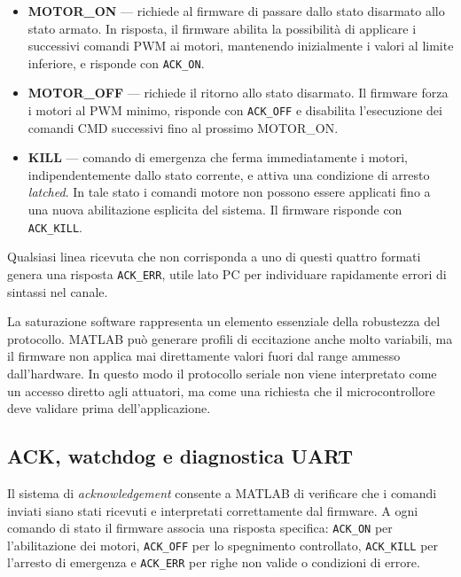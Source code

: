 \documentclass[11pt]{report}
\begin{document}
\begin{itemize}
\begin{lstlisting}[caption={Parsing del comando CMD e saturazione dei valori PWM ricevuti da MATLAB.}, label={lst:nome}]
        ext_roll_pwm  = (uint16_t) roll;
        ext_pitch_pwm = (uint16_t) pitch;
    }
}

}
\end{lstlisting}

    \item \textbf{MOTOR\_ON} — richiede al firmware di passare dallo stato disarmato allo stato armato. In risposta, il firmware abilita la possibilità di applicare i successivi comandi PWM ai motori, mantenendo inizialmente i valori al limite inferiore, e risponde con \texttt{ACK\_ON}.

    \item \textbf{MOTOR\_OFF} — richiede il ritorno allo stato disarmato. Il firmware forza i motori al PWM minimo, risponde con \texttt{ACK\_OFF} e disabilita l'esecuzione dei comandi CMD successivi fino al prossimo MOTOR\_ON.

    \item \textbf{KILL} — comando di emergenza che ferma immediatamente i motori, indipendentemente dallo stato corrente, e attiva una condizione di arresto \textit{latched}. In tale stato i comandi motore non possono essere applicati fino a una nuova abilitazione esplicita del sistema. Il firmware risponde con \texttt{ACK\_KILL}.
\end{itemize}

Qualsiasi linea ricevuta che non corrisponda a uno di questi quattro formati genera una risposta \texttt{ACK\_ERR}, utile lato PC per individuare rapidamente errori di sintassi nel canale.

La saturazione software rappresenta un elemento essenziale della robustezza del protocollo. MATLAB può generare profili di eccitazione anche molto variabili, ma il firmware non applica mai direttamente valori fuori dal range ammesso dall'hardware. In questo modo il protocollo seriale non viene interpretato come un accesso diretto agli attuatori, ma come una richiesta che il microcontrollore deve validare prima dell'applicazione.

\subsection{ACK, watchdog e diagnostica UART}
Il sistema di \textit{acknowledgement} consente a MATLAB di verificare che i comandi inviati siano stati ricevuti e interpretati correttamente dal firmware. A ogni comando di stato il firmware associa una risposta specifica: \texttt{ACK\_ON} per l'abilitazione dei motori, \texttt{ACK\_OFF} per lo spegnimento controllato, \texttt{ACK\_KILL} per l'arresto di emergenza e \texttt{ACK\_ERR} per righe non valide o condizioni di errore.
\end{document}
